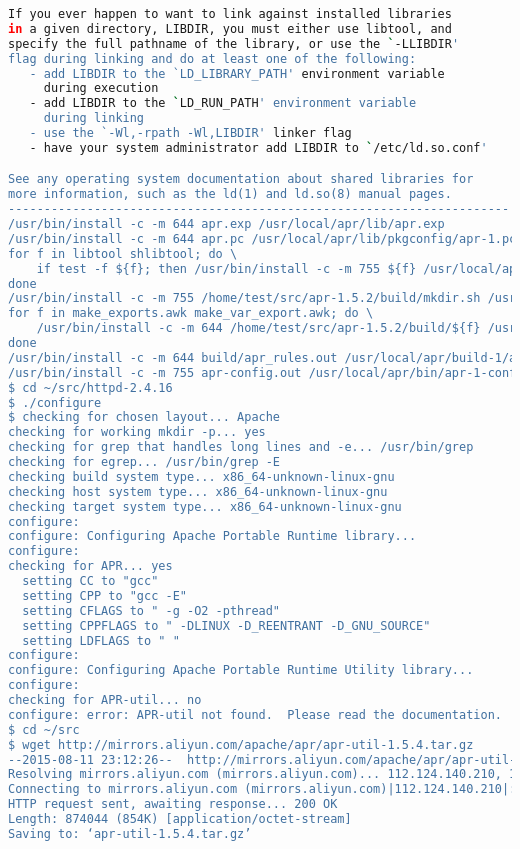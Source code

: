 \begin{lstlisting}[language=bash]
If you ever happen to want to link against installed libraries
in a given directory, LIBDIR, you must either use libtool, and
specify the full pathname of the library, or use the `-LLIBDIR'
flag during linking and do at least one of the following:
   - add LIBDIR to the `LD_LIBRARY_PATH' environment variable
     during execution
   - add LIBDIR to the `LD_RUN_PATH' environment variable
     during linking
   - use the `-Wl,-rpath -Wl,LIBDIR' linker flag
   - have your system administrator add LIBDIR to `/etc/ld.so.conf'

See any operating system documentation about shared libraries for
more information, such as the ld(1) and ld.so(8) manual pages.
----------------------------------------------------------------------
/usr/bin/install -c -m 644 apr.exp /usr/local/apr/lib/apr.exp
/usr/bin/install -c -m 644 apr.pc /usr/local/apr/lib/pkgconfig/apr-1.pc
for f in libtool shlibtool; do \
    if test -f ${f}; then /usr/bin/install -c -m 755 ${f} /usr/local/apr/build-1; fi; \
done
/usr/bin/install -c -m 755 /home/test/src/apr-1.5.2/build/mkdir.sh /usr/local/apr/build-1
for f in make_exports.awk make_var_export.awk; do \
    /usr/bin/install -c -m 644 /home/test/src/apr-1.5.2/build/${f} /usr/local/apr/build-1; \
done
/usr/bin/install -c -m 644 build/apr_rules.out /usr/local/apr/build-1/apr_rules.mk
/usr/bin/install -c -m 755 apr-config.out /usr/local/apr/bin/apr-1-config
$ cd ~/src/httpd-2.4.16
$ ./configure
$ checking for chosen layout... Apache
checking for working mkdir -p... yes
checking for grep that handles long lines and -e... /usr/bin/grep
checking for egrep... /usr/bin/grep -E
checking build system type... x86_64-unknown-linux-gnu
checking host system type... x86_64-unknown-linux-gnu
checking target system type... x86_64-unknown-linux-gnu
configure: 
configure: Configuring Apache Portable Runtime library...
configure: 
checking for APR... yes
  setting CC to "gcc"
  setting CPP to "gcc -E"
  setting CFLAGS to " -g -O2 -pthread"
  setting CPPFLAGS to " -DLINUX -D_REENTRANT -D_GNU_SOURCE"
  setting LDFLAGS to " "
configure: 
configure: Configuring Apache Portable Runtime Utility library...
configure: 
checking for APR-util... no
configure: error: APR-util not found.  Please read the documentation.
$ cd ~/src
$ wget http://mirrors.aliyun.com/apache/apr/apr-util-1.5.4.tar.gz
--2015-08-11 23:12:26--  http://mirrors.aliyun.com/apache/apr/apr-util-1.5.4.tar.gz
Resolving mirrors.aliyun.com (mirrors.aliyun.com)... 112.124.140.210, 115.28.122.210
Connecting to mirrors.aliyun.com (mirrors.aliyun.com)|112.124.140.210|:80... connected.
HTTP request sent, awaiting response... 200 OK
Length: 874044 (854K) [application/octet-stream]
Saving to: ‘apr-util-1.5.4.tar.gz’


\end{lstlisting}

